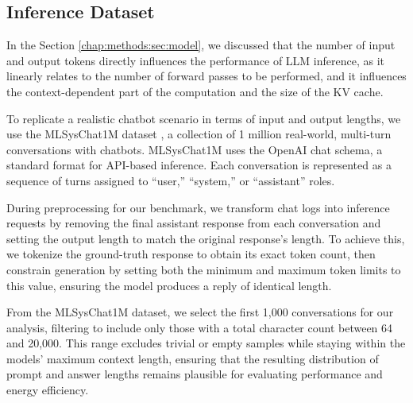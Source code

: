 \subsection{Inference Dataset}
\label{chap:methods:sec:dataset}

In the Section \ref{chap:methods:sec:model}, we discussed that the number of input and output tokens directly influences the performance of LLM inference, as it linearly relates to the number of forward passes to be performed, and it influences the context-dependent part of the computation and the size of the KV cache.

To replicate a realistic chatbot scenario in terms of input and output lengths, we use the MLSysChat1M dataset \cite{zheng2023lmsys}, a collection of 1 million real-world, multi-turn conversations with chatbots.
MLSysChat1M uses the OpenAI chat schema, a standard format for API-based inference. Each conversation is represented as a sequence of turns assigned to “user,” “system,” or “assistant” roles.

During preprocessing for our benchmark, we transform chat logs into inference requests by removing the final assistant response from each conversation and setting the output length to match the original response's length. To achieve this, we tokenize the ground-truth response to obtain its exact token count, then constrain generation by setting both the minimum and maximum token limits to this value, ensuring the model produces a reply of identical length.

From the MLSysChat1M dataset, we select the first 1,000 conversations for our analysis, filtering to include only those with a total character count between 64 and 20,000. This range excludes trivial or empty samples while staying within the models’ maximum context length, ensuring that the resulting distribution of prompt and answer lengths remains plausible for evaluating performance and energy efficiency.
